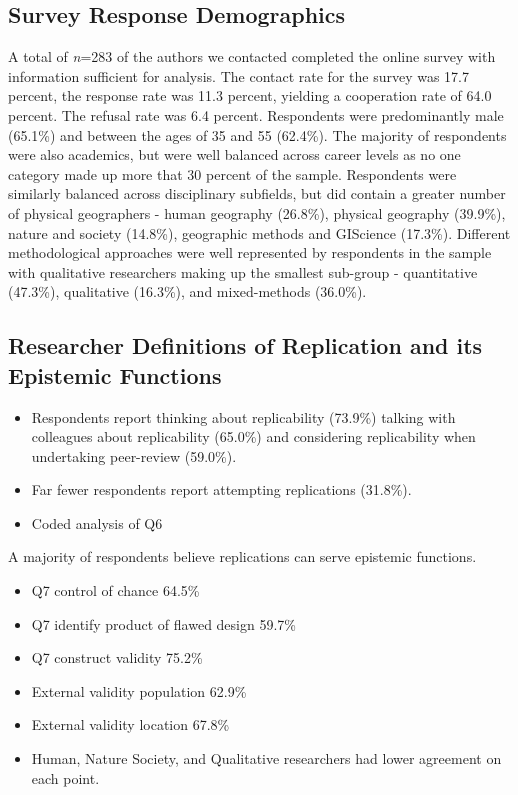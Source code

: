 \documentclass[]{interact}
\theoremstyle{plain}%
\theoremstyle{definition}
\theoremstyle{remark}
\begin{document}
\subsection*{Survey Response Demographics}
A total of \textit{n}=283 of the authors we contacted completed the online survey with information sufficient for analysis. 
The contact rate for the survey was 17.7 percent, the response rate was 11.3 percent, yielding a cooperation rate of 64.0 percent. 
The refusal rate was 6.4 percent.
Respondents were predominantly male (65.1\%) and between the ages of 35 and 55 (62.4\%). 
The majority of respondents were also academics, but were well balanced across career levels as no one category made up more that 30 percent of the sample.
Respondents were similarly balanced across disciplinary subfields, but did contain a greater number of physical geographers  - human geography (26.8\%), physical geography (39.9\%), nature and society (14.8\%), geographic methods and GIScience (17.3\%). 
Different methodological approaches were well represented by respondents in the sample with qualitative researchers making up the smallest sub-group  - quantitative (47.3\%), qualitative (16.3\%), and mixed-methods (36.0\%).

\subsection*{Researcher Definitions of Replication and its Epistemic Functions}
\begin{itemize}
    \item Respondents report thinking about replicability (73.9\%) talking with colleagues about replicability (65.0\%) and considering replicability when undertaking peer-review (59.0\%). 
    \item Far fewer respondents report attempting replications (31.8\%). 
\end{itemize}

\begin{itemize}
    \item Coded analysis of Q6
\end{itemize}

A majority of respondents believe replications can serve epistemic functions.
\begin{itemize}
    \item Q7 control of chance 64.5\%
    \item Q7 identify product of flawed design 59.7\%
    \item Q7 construct validity 75.2\%
    \item External validity population 62.9\%
    \item External validity location 67.8\%
    \item Human, Nature Society, and Qualitative researchers had lower agreement on each point.
\end{itemize}
\end{document}
